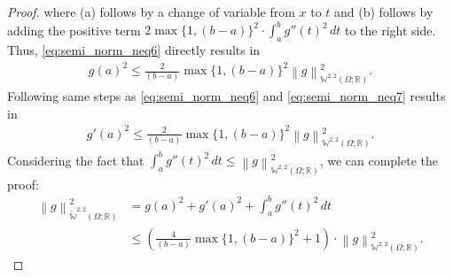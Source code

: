 \documentclass[10pt,a4paper]{amsart}
\newcommand{\norm}[1]{\left\lVert#1\right\rVert}
\newcommand{\sob}[2]{\mathbb{W}^{#1,#2}\left(\Omega; \mathbb{R}\right)}
\newcommand{\sobeq}[2]{\widetilde{\mathbb{W}}^{#1,#2}\left(\Omega; \mathbb{R}\right)}
\begin{document}
\begin{proof}
    where (a) follows by a change of variable from $x$ to $t$ and (b) follows by adding the positive term $2\max\{1, (b-a)\}^2 \cdot \int_a^b g''(t)^2\,dt$ to the right side. Thus, \eqref{eq:semi_norm_neq6} directly results in
    \begin{align}\label{eq:semi_norm_neq7}
        g(a)^2 \leqslant \frac{2}{(b-a)}\max\{1, (b-a)\}^2 \norm{g}^2_{\sob{2}{2}}.
    \end{align}
    Following same steps as \eqref{eq:semi_norm_neq6} and \eqref{eq:semi_norm_neq7} results in
    \begin{align}
        g'(a)^2 \leqslant \frac{2}{(b-a)}\max\{1, (b-a)\}^2 \norm{g}^2_{\sob{2}{2}}.
    \end{align}
    Considering the fact that $\int_a^b g''(t)^2\,dt \leqslant \norm{g}^2_{\sob{2}{2}}$, we can complete the proof:
    \begin{align}
        \norm{g}^2_{\sobeq{2}{2}} &= g(a)^2 + g'(a)^2 + \int_a^b g''(t)^2\,dt  \nonumber \\ &\leqslant \left(\frac{4}{(b-a)}\max\{1, (b-a)\}^2 + 1\right)\cdot\norm{g}^2_{\sob{2}{2}}.
    \end{align}
\end{proof}
\end{document}
